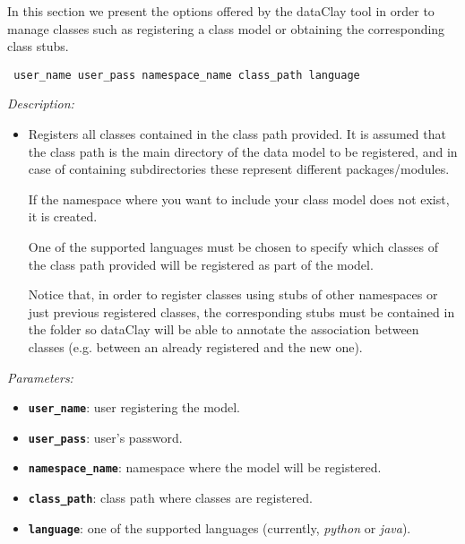 In this section we present the options offered by the dataClay tool in order to manage classes such as registering a class model or obtaining the corresponding class stubs.


\begin{dBox}
\texttt{ \newline user\_name user\_pass namespace\_name class\_path language 
}
\LINE

{\it Description:}

\begin{itemize}
    \item Registers all classes contained in the class path provided. It is assumed that the class path is the main directory of the data model to be registered, and in case of containing subdirectories these represent different packages/modules.
    
    If the namespace where you want to include your class model does not exist, it is created.
    
    One of the supported languages must be chosen to specify which classes of the class path provided will be registered as part of the model.
    
    Notice that, in order to register classes using stubs of other namespaces or just previous registered classes, the corresponding stubs must be contained in the folder so dataClay will be able to annotate the association between classes (e.g. between an already registered and the new one).
   
\end{itemize}

{\it Parameters:}

\begin{itemize}
    \item \texttt{\bfseries user\_name}: user registering the model.
    \item \texttt{\bfseries user\_pass}: user's password.
    \item \texttt{\bfseries namespace\_name}: namespace where the model will be registered.
    \item \texttt{\bfseries class\_path}: class path where classes are registered.
    \item \texttt{\bfseries language}: one of the supported languages (currently, \textit{python} or \textit{java}).
\end{itemize}


\end{dBox}

